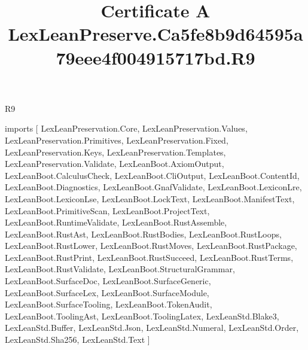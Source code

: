 \begin{lexlean}{R9}
\title{Certificate A LexLeanPreserve.Ca5fe8b9d64595a79eee4f004915717bd.R9}
\begin{coremodule}
imports [
  LexLeanPreservation.Core,
  LexLeanPreservation.Values,
  LexLeanPreservation.Primitives,
  LexLeanPreservation.Fixed,
  LexLeanPreservation.Keys,
  LexLeanPreservation.Templates,
  LexLeanPreservation.Validate,
  LexLeanBoot.AxiomOutput,
  LexLeanBoot.CalculusCheck,
  LexLeanBoot.CliOutput,
  LexLeanBoot.ContentId,
  LexLeanBoot.Diagnostics,
  LexLeanBoot.GnafValidate,
  LexLeanBoot.LexiconLre,
  LexLeanBoot.LexiconLse,
  LexLeanBoot.LockText,
  LexLeanBoot.ManifestText,
  LexLeanBoot.PrimitiveScan,
  LexLeanBoot.ProjectText,
  LexLeanBoot.RuntimeValidate,
  LexLeanBoot.RustAssemble,
  LexLeanBoot.RustAst,
  LexLeanBoot.RustBodies,
  LexLeanBoot.RustLoops,
  LexLeanBoot.RustLower,
  LexLeanBoot.RustMoves,
  LexLeanBoot.RustPackage,
  LexLeanBoot.RustPrint,
  LexLeanBoot.RustSucceed,
  LexLeanBoot.RustTerms,
  LexLeanBoot.RustValidate,
  LexLeanBoot.StructuralGrammar,
  LexLeanBoot.SurfaceDoc,
  LexLeanBoot.SurfaceGeneric,
  LexLeanBoot.SurfaceLex,
  LexLeanBoot.SurfaceModule,
  LexLeanBoot.SurfaceTooling,
  LexLeanBoot.TokenAudit,
  LexLeanBoot.ToolingAst,
  LexLeanBoot.ToolingLatex,
  LexLeanStd.Blake3,
  LexLeanStd.Buffer,
  LexLeanStd.Json,
  LexLeanStd.Numeral,
  LexLeanStd.Order,
  LexLeanStd.Sha256,
  LexLeanStd.Text
]


\end{coremodule}
\end{lexlean}
